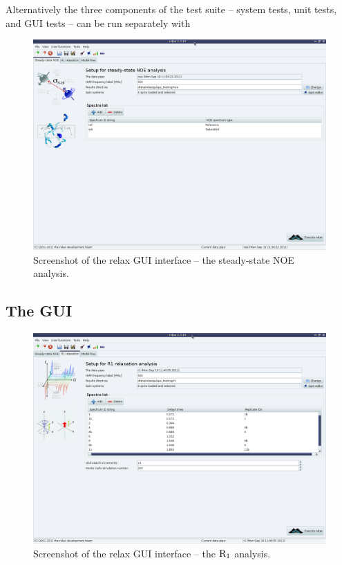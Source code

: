 
Alternatively the three components of the test suite -- system tests, unit tests, and GUI tests -- can be run separately with





\begin{figure}
\centerline{\includegraphics[width=\textwidth, bb=14 14 1065 768]{graphics/screenshots/analysis_noe}}
\caption[GUI screenshot -- NOE analysis]{Screenshot of the relax GUI interface -- the steady-state NOE analysis.}\label{fig: screenshot: NOE analysis}
\end{figure}



\subsection{The GUI}

\begin{figure}
\centerline{\includegraphics[width=\textwidth, bb=14 14 1065 768]{graphics/screenshots/analysis_r1}}
\caption[GUI screenshot -- $\Rone$ analysis]{Screenshot of the relax GUI interface -- the $\Rone$ analysis.}\label{fig: screenshot: R1 analysis}
\end{figure}


